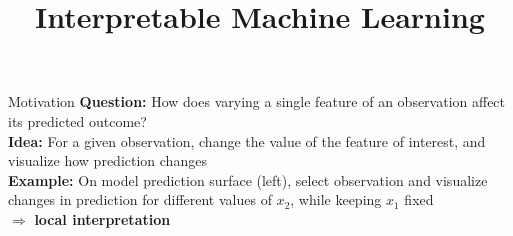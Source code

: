 \documentclass[10pt,compress,t,notes=noshow, xcolor=table]{beamer}
\title{Interpretable Machine Learning}
\begin{document}


\begin{framev}[align=top]{Motivation}
\textbf{Question:} How does varying a single feature of an observation affect its predicted outcome?\\
\spacer[0.25]
\textbf{Idea:} For a given observation, change the value of the feature of interest, and visualize how prediction changes\\
\spacer[0.25]
\textbf{Example:} On model prediction surface (left), select observation and visualize changes in prediction for different values of $x_2$, while keeping $x_1$ fixed \\ $\Rightarrow$ \textbf{local interpretation}
\\
\spacer[0.25]
\end{framev}
\end{document}
